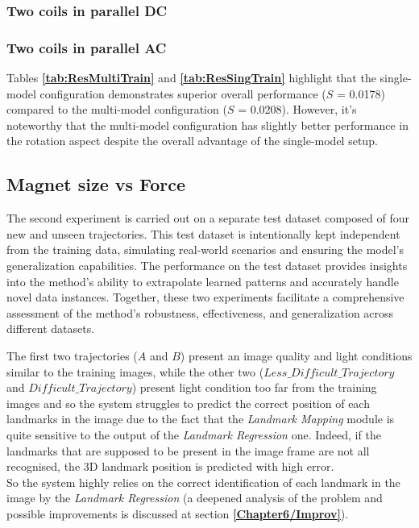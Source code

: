 \subsubsection{Two coils in parallel DC}
\subsubsection{Two coils in parallel AC}

\newpage
Tables \textbf{\ref{tab:ResMultiTrain}} and \textbf{\ref{tab:ResSingTrain}} highlight that the single-model configuration demonstrates superior overall performance ($S$ = 0.0178) compared to the multi-model configuration ($S$ = 0.0208). However, it's noteworthy that the multi-model configuration has slightly better performance in the rotation aspect despite the overall advantage of the single-model setup.

\subsection{Magnet size vs Force}
\label{Chapter5/EvalTest}
The second experiment is carried out on a separate test dataset composed of four new and unseen trajectories. This test dataset is intentionally kept independent from the training data, simulating real-world scenarios and ensuring the model's generalization capabilities. The performance on the test dataset provides insights into the method's ability to extrapolate learned patterns and accurately handle novel data instances. Together, these two experiments facilitate a comprehensive assessment of the method's robustness, effectiveness, and generalization across different datasets.

The first two trajectories ($A$ and $B$) present an image quality and light conditions similar to the training images, while the other two ($Less\_Difficult\_Trajectory$ and $Difficult\_Trajectory$) present light condition too far from the training images and so the system struggles to predict the correct position of each landmarks in the image due to the fact that the \textit{Landmark Mapping} module is quite sensitive to the output of the \textit{Landmark Regression} one. Indeed, if the landmarks that are supposed to be present in the image frame are not all recognised, the 3D landmark position is predicted with high error.\\
So the system highly relies on the correct identification of each landmark in the image by the \textit{Landmark Regression} (a deepened analysis of the problem and possible improvements is discussed at section \textbf{\ref{Chapter6/Improv}}). 


